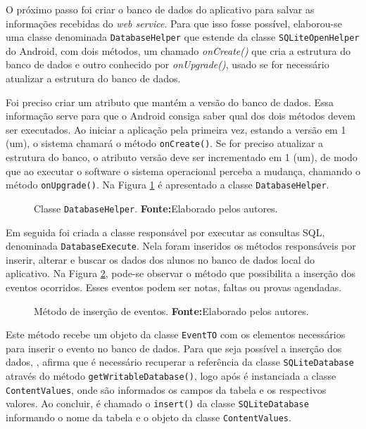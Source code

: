 	\par O próximo passo foi criar o banco de dados do aplicativo para salvar as
informações recebidas do \textit{web service}. Para que isso fosse possível,
elaborou-se uma classe denominada \texttt{DatabaseHelper} que estende da classe
\texttt{SQLiteOpenHelper} do Android, com dois métodos, um chamado
\textit{onCreate()} que cria a estrutura do banco de dados e outro conhecido
por \textit{onUpgrade()}, usado se for necessário atualizar a estrutura do
banco de dados.

	\par Foi preciso criar um atributo que mantém a versão do banco de dados. Essa
informação serve para que o Android consiga saber qual dos dois métodos devem
ser executados. Ao iniciar a aplicação pela primeira vez, estando a versão em 1
(um), o sistema chamará o método \texttt{onCreate()}. Se for preciso atualizar
a estrutura do banco, o atributo versão deve ser incrementado em 1 (um), de
modo que ao executar o software o sistema operacional perceba a mudança,
chamando o método \texttt{onUpgrade()}. Na Figura \ref{fig:app5} é apresentado a
classe \texttt{DatabaseHelper}.

	\begin{figure}[h!] 
		
		\caption[Classe DatabaseHelper]{Classe \texttt{DatabaseHelper}.
		\textbf{Fonte:}Elaborado pelos autores.}
		\label{fig:app5}
	\end{figure}
	
	\par Em seguida foi criada a classe responsável por executar as consultas SQL,
denominada \texttt{DatabaseExecute}. Nela foram inseridos os métodos
responsáveis por inserir, alterar e buscar os dados dos alunos no banco de
dados local do aplicativo. Na Figura \ref{fig:app6}, pode-se observar o método
que possibilita a inserção dos eventos ocorridos. Esses eventos podem ser
notas, faltas ou provas agendadas.
	
	
	\begin{figure}[h!] 
		
		\caption[Método de inserção de eventos]{Método de inserção de eventos.
		\textbf{Fonte:}Elaborado pelos autores.}
		\label{fig:app6}
	\end{figure}
	
	\pagebreak
	
	\par Este método recebe um objeto da classe \texttt{EventTO} com os elementos
necessários para inserir o evento no banco de dados. Para que seja possível a
inserção dos dados, , afirma que é necessário
recuperar a referência da classe \texttt{SQLiteDatabase} através do método
\texttt{getWritableDatabase()}, logo após é instanciada a classe
\texttt{ContentValues}, onde são informados os campos da tabela e os
respectivos valores. Ao concluir, é chamado o \texttt{insert()} da classe
\texttt{SQLiteDatabase} informando o nome da tabela e o objeto da classe
\texttt{ContentValues}.

